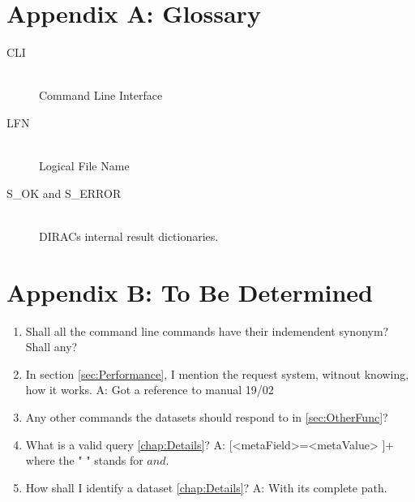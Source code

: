 \documentclass{scrreprt}
\begin{document}
\newpage
\appendix
\chapter*{Appendix A: Glossary} \label{app:AppendixA}
\begin{description}
\item[CLI] \hfill \\
Command Line Interface
\item[LFN] \hfill \\
Logical File Name
\item[S_OK and S_ERROR] \hfill \\
DIRACs internal result dictionaries.
\end{description}

\newpage
\appendix
\chapter*{Appendix B: To Be Determined} \label{app:AppendixB}
\begin{enumerate}
\item Shall all the command line commands have their indemendent synonym? Shall any?
\item In section \ref{sec:Performance}, I mention the request system, witnout knowing, how it works. A: Got a reference to manual 19/02
\item Any other commands the datasets should respond to in \ref{sec:OtherFunc}?
\item What is a valid query \ref{chap:Details}? A: [<metaField>=<metaValue> ]+ where the " " stands for $and$.
\item How shall I identify a dataset \ref{chap:Details}? A: With its complete path.
\end{enumerate}
\end{document}
